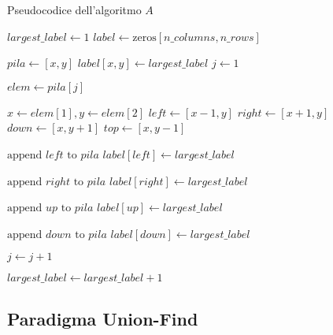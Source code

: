 \begin{algorithm}[H]
    \caption{Pseudocodice dell'algoritmo $A$}
    \label{alg:standard}
    {\small
    \begin{algorithmic}[1]
    \State $largest\_label \gets 1$ 
    \State $label \gets \text{zeros}[n\_columns, n\_rows]$
    
            \State $pila \gets [x, y]$ 
            \State $label[x, y] \gets largest\_label$
            \State $j \gets 1$
            
                \State $elem \gets pila[j]$
                
                \State $x \gets elem[1], y \gets elem[2]$
                \State $left \gets [x - 1, y]$
                \State $right \gets [x + 1, y]$
                \State $down \gets [x, y+1]$
                \State $top \gets [x, y-1]$
                
                    \State $\text{append } left \text{ to } pila$
                    \State $label[left] \gets largest\_label$
                \EndIf
                
                    \State $\text{append } right \text{ to } pila$
                    \State $label[right] \gets largest\_label$
                \EndIf
                
                    \State $\text{append } up \text{ to } pila$
                    \State $label[up] \gets largest\_label$
                \EndIf
                
                    \State $\text{append } down \text{ to } pila$
                    \State $label[down] \gets largest\_label$
                \EndIf
                
                \State $j \gets j + 1$
            \EndWhile
            
            \State $largest\_label \gets largest\_label + 1$
        \EndIf
    \EndFor
    \end{algorithmic}
    }
\end{algorithm}

\subsection*{Paradigma Union-Find}

